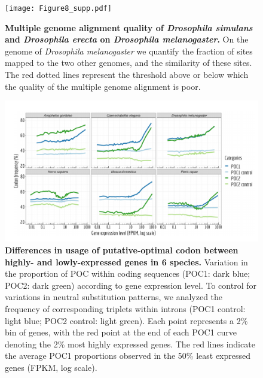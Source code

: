 \begin{figure}[t]
    \centering                                                                            
    \texttt{[image: Figure8\_supp.pdf]}
    \caption[Multiple genome alignment quality of \textit{Drosophila simulans} and \textit{Drosophila erecta} on \textit{Drosophila melanogaster}]{\textbf{Multiple genome alignment quality of \textit{Drosophila simulans} and \textit{Drosophila erecta} on \textit{Drosophila melanogaster}.} 
    On the genome of \textit{Drosophila melanogaster} we quantify the fraction of sites mapped to the two other genomes, and the similarity of these sites. The red dotted lines represent the threshold above or below which the quality of the multiple genome alignment is poor.} 
    \label{suppfig:CU8}
\end{figure}

\begin{figure}[t]
    \centering                                                                            
    \includegraphics[width=\textwidth]{Figure9_supp.pdf}
    \caption[Differences in usage of putative-optimal codon between highly- and lowly-expressed genes in 6 species]{\textbf{Differences in usage of putative-optimal codon between highly- and lowly-expressed genes in 6 species.} Variation in the proportion of POC within coding sequences (POC1: dark blue; POC2: dark green) according to gene expression level. To control for variations in neutral substitution patterns, we analyzed the frequency of corresponding triplets within introns (POC1 control: light blue; POC2 control: light green). Each point represents a 2\% bin of genes, with the red point at the end of each POC1 curve denoting the 2\% most highly expressed genes. The red lines indicate the average POC1 proportions observed in the 50\% least expressed genes (FPKM, log scale).} 
    \label{suppfig:CU9}
\end{figure}



